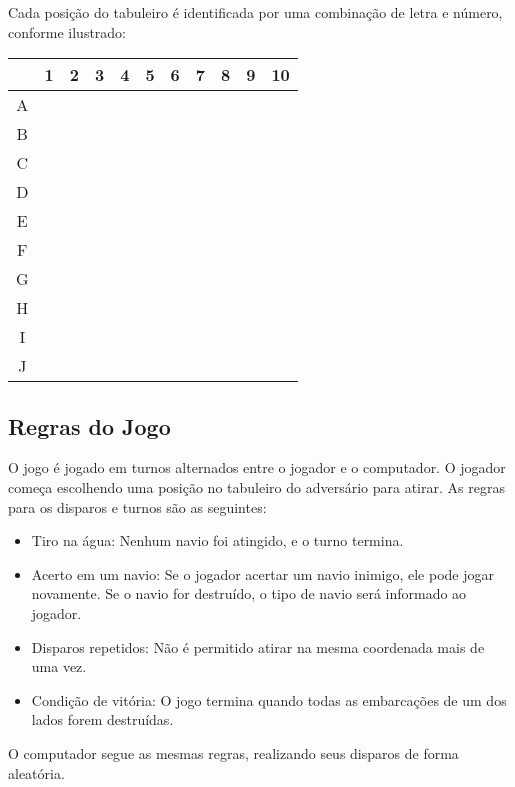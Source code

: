 \documentclass[12pt]{article}
\begin{document}
Cada posição do tabuleiro é identificada por uma combinação de letra e número, conforme ilustrado:

\begin{center}

  \begin{tabular}{c|c|c|c|c|c|c|c|c|c|c|}
    & 1 & 2 & 3 & 4 & 5 & 6 & 7 & 8 & 9 & 10 \\
    \hline
    A & &&&&&&&&&\\
    \hline
    B & &&&&&&&&&\\
    \hline
    C & &&&&&&&&&\\
    \hline
    D & &&&&&&&&&\\
    \hline
    E & &&&&&&&&&\\
    \hline
    F & &&&&&&&&&\\
    \hline
    G & &&&&&&&&&\\
    \hline
    H & &&&&&&&&&\\
    \hline
    I & &&&&&&&&&\\
    \hline
    J & &&&&&&&&&\\
    \hline
  \end{tabular}
\end{center}

\subsection*{Regras do Jogo}

O jogo é jogado em turnos alternados entre o jogador e o computador. O jogador começa escolhendo uma posição no tabuleiro do adversário para atirar. As regras para os disparos e turnos são as seguintes:

\begin{itemize}
  \item {Tiro na água}: Nenhum navio foi atingido, e o turno termina.

  \item {Acerto em um navio}: Se o jogador acertar um navio inimigo, ele pode jogar novamente. Se o navio for destruído, o tipo de navio será informado ao jogador.
  \item {Disparos repetidos}: Não é permitido atirar na mesma coordenada mais de uma vez.
  \item {Condição de vitória}: O jogo termina quando todas as embarcações de um dos lados forem destruídas.
\end{itemize}

O computador segue as mesmas regras, realizando seus disparos de forma aleatória.
\end{document}
